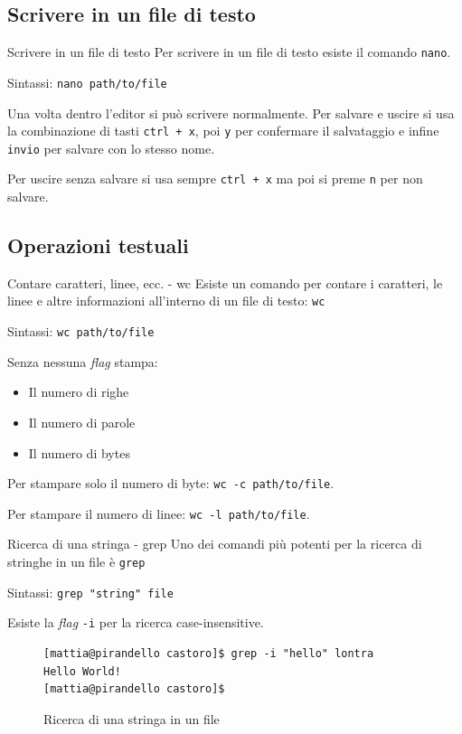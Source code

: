 \subsection{Scrivere in un file di testo}
\begin{frame}[fragile]{Scrivere in un file di testo}
  Per scrivere in un file di testo esiste il comando \texttt{nano}.\bigskip

  Sintassi: \texttt{nano path/to/file}\bigskip

  Una volta dentro l'editor si può scrivere normalmente. Per salvare e uscire
  si usa la combinazione di tasti \texttt{ctrl + x}, poi \texttt{y} per 
  confermare il salvataggio e infine \texttt{invio} per salvare con lo stesso
  nome.\bigskip

  Per uscire senza salvare si usa sempre \texttt{ctrl + x} ma poi si preme
  \texttt{n} per non salvare.
\end{frame}

\subsection{Operazioni testuali}
\begin{frame}{Contare caratteri, linee, ecc. - wc}
  Esiste un comando per contare i caratteri, le linee e altre informazioni
  all'interno di un file di testo: \texttt{wc}\bigskip

  Sintassi: \texttt{wc path/to/file}\bigskip

  Senza nessuna \textit{flag} stampa:
  \begin{itemize}
    \item Il numero di righe
    \item Il numero di parole
    \item Il numero di bytes
  \end{itemize}
  Per stampare solo il numero di byte: \texttt{wc -c path/to/file}.


  Per stampare il numero di linee: \texttt{wc -l path/to/file}.
\end{frame}

\begin{frame}[fragile]{Ricerca di una stringa - grep}
  Uno dei comandi più potenti per la ricerca di stringhe in un file è \texttt{grep}\bigskip

  Sintassi: \texttt{grep "string" file}\bigskip

  Esiste la \textit{flag} \texttt{-i} per la ricerca case-insensitive.\bigskip

  \begin{figure}
    \begin{lstlisting}[basicstyle=\footnotesize]
[mattia@pirandello castoro]$ grep -i "hello" lontra
Hello World!
[mattia@pirandello castoro]$
    \end{lstlisting}
    \caption{Ricerca di una stringa in un file}
  \end{figure}
\end{frame}


